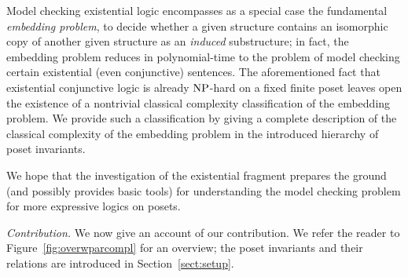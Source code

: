 \documentclass[usletter]{article}
\begin{document}
Model checking existential logic encompasses as a special case the fundamental \emph{embedding problem}, to decide whether a given structure contains an isomorphic 
copy of another given structure as an \emph{induced} substructure; 
in fact, the embedding problem reduces in polynomial-time to the problem of 
model checking certain existential (even conjunctive) sentences.  The aforementioned fact 
that existential conjunctive logic is already $\textup{NP}$-hard on a fixed finite poset 
leaves open the existence of a nontrivial classical complexity classification of the embedding problem. 
We provide such a classification by giving a complete description of 
the classical complexity of the embedding problem in the introduced hierarchy of poset invariants.  




We hope that the investigation of the existential fragment prepares the ground 
(and possibly provides basic tools) for understanding the model checking problem 
for more expressive logics on posets.








\medskip

\noindent \textit{Contribution.}  We now give an account of our contribution.  
We refer the reader to Figure~\ref{fig:overwparcompl} for an overview; 
the poset invariants and their relations are introduced in Section~\ref{sect:setup}.  
\end{document}
